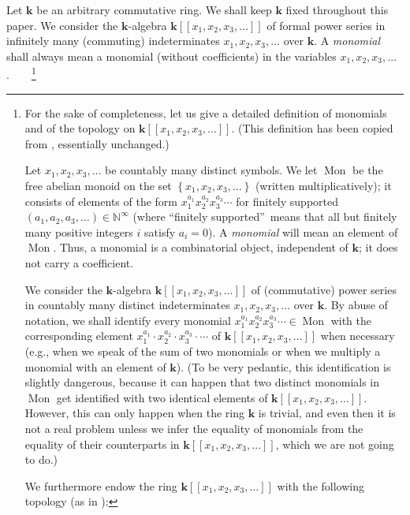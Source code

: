 \documentclass[numbers=enddot,12pt,final,onecolumn,notitlepage,abstracton]{scrartcl}
\theoremstyle{definition}
\newcommand{\kk}{{\mathbf{k}}}
\newcommand{\Mon}{\operatorname{Mon}}
\newcommand{\Powser}{\mathbf{k}\left[\left[x_1,x_2,x_3,\ldots\right]\right]}
\newcommand{\NN}{{\mathbb{N}}}
\begin{document}
Let $\kk$ be an arbitrary commutative ring. We shall keep $\kk$ fixed
throughout this paper.
We consider the $\kk$-algebra $\Powser$ of formal
power series in infinitely many (commuting) indeterminates
$x_1, x_2, x_3, \ldots$ over $\kk$. A \textit{monomial} shall always
mean a monomial (without coefficients) in the variables
$x_1, x_2, x_3, \ldots$.\ \ \ \ \footnote{For the sake of completeness,
let us give a detailed definition of monomials and of the topology
on $\Powser$. (This definition has been copied from
\cite[\S 2]{Gri-dimm}, essentially unchanged.)

Let $x_{1},x_{2},x_{3},\ldots$ be countably many distinct symbols. We
let $\Mon$ be the free abelian monoid on the set $\left\{
x_{1},x_{2},x_{3},\ldots\right\}  $ (written multiplicatively); it consists of
elements of the form $x_{1}^{a_{1}}x_{2}^{a_{2}}x_{3}^{a_{3}}\cdots$ for
finitely supported $\left(  a_{1},a_{2},a_{3},\ldots\right)  \in
 \NN ^{\infty}$ (where \textquotedblleft finitely
supported\textquotedblright\ means that all but finitely many positive
integers $i$ satisfy $a_{i}=0$). A \textit{monomial} will mean an element of
$\Mon$. Thus, a monomial is a combinatorial
object, independent of $\kk$; it does not carry a coefficient.

We consider the $\kk$-algebra $\Powser$ of (commutative) power
series in
countably many distinct indeterminates $x_{1},x_{2},x_{3},\ldots$ over
$\kk$. By abuse of notation, we shall identify every monomial
$x_{1}^{a_{1}} x_{2}^{a_{2}} x_{3}^{a_{3}} \cdots \in \Mon$ with the
corresponding element
$x_{1}^{a_{1}} \cdot x_{2}^{a_{2}} \cdot x_{3}^{a_{3}} \cdot \cdots$
of $\Powser$ when necessary
(e.g., when we speak of the sum of two monomials or
when we multiply a monomial with an element of $\kk$). (To be
very pedantic, this identification is slightly dangerous, because
it can happen that two distinct monomials in $\Mon$ get
identified with two identical elements of $\Powser$. However, this
can only happen when the ring $\kk$ is trivial, and even then it is
not a real problem unless we infer the equality of monomials from the
equality of their counterparts in $\Powser$, which we are not going to
do.)

We furthermore endow the ring $\Powser$ with the following topology
(as in \cite[Proof of Corollary 2.6.11]{Reiner}):

}
\end{document}
